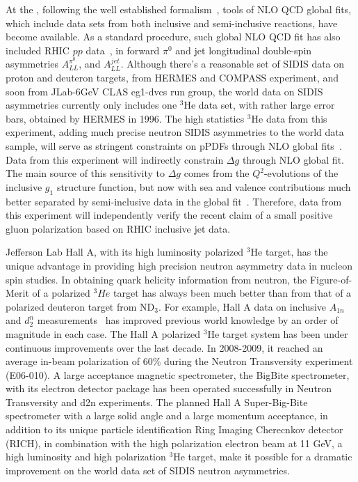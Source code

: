 At the \nloo, following the well established formalism~\cite{PhysRevLett.101.072001},
tools of NLO QCD global fits, which include data sets from both inclusive and semi-inclusive reactions,
have become available.   As a standard procedure,  such global NLO QCD fit
has also included RHIC $pp$ data~\cite{deFlorian:2014yva}, in forward $\pi^0$ and jet longitudinal double-spin asymmetries $A_{LL}^{\pi^0}$, and $A_{LL}^{jet}$. 
Although there's a reasonable  set of SIDIS  data on proton and deuteron targets, from HERMES and COMPASS experiment, and soon from JLab-6GeV CLAS eg1-dvcs run group,  the world data on SIDIS asymmetries  currently only includes
one $^3$He data set, with rather large error bars, obtained by HERMES in 1996.
The high statistics $^3$He data from this experiment, adding much precise
 neutron SIDIS asymmetries to the world data sample,  
will serve as stringent constraints on pPDFs through NLO global fits~\cite{epjcxj2006}. 
Data from this experiment  will  indirectly constrain  $\Delta g$   through NLO global fit. 
The main source of this sensitivity to $\Delta g$ comes from 
the $Q^2$-evolutions of the inclusive $g_1$ structure function, but now with 
 sea and valence contributions much better
 separated by semi-inclusive data in the global fit~\cite{sassotnlo,epjcxj2006}.
Therefore,  data from this experiment will  independently verify 
the recent claim of a small positive gluon polarization based on RHIC inclusive jet data. 

Jefferson Lab Hall A, with its high luminosity polarized $^3$He target, has the unique
advantage in providing high precision neutron asymmetry data in nucleon spin studies. 
In obtaining quark helicity information from neutron,  the Figure-of-Merit of  a polarized $^3He$ target has always been much better than from that of a polarized deuteron target from ND$_3$.
For example, Hall A data on inclusive  $A_{1n}$ and $d_2^n$ measurements~\cite{A1N_PR}
has improved previous world knowledge by an order of magnitude in each case. 
The Hall A polarized $^3$He target system has been under continuous improvements over 
the last decade.  In 2008-2009, it reached an average in-beam polarization of 60$\%$  
during the Neutron Transversity experiment (E06-010).
A large acceptance magnetic spectrometer, the BigBite spectrometer, with its electron detector package
has been operated successfully in Neutron Transversity and d2n experiments. 
The planned Hall A Super-Big-Bite spectrometer with  a large solid angle and a large momentum acceptance, in addition to its unique particle identification Ring Imaging Cherecnkov  detector (RICH), 
in  combination with the high polarization electron beam at 11 GeV, 
a high luminosity and high polarization $^3$He target,  make it possible for a dramatic improvement on the world data set of 
SIDIS neutron asymmetries.

